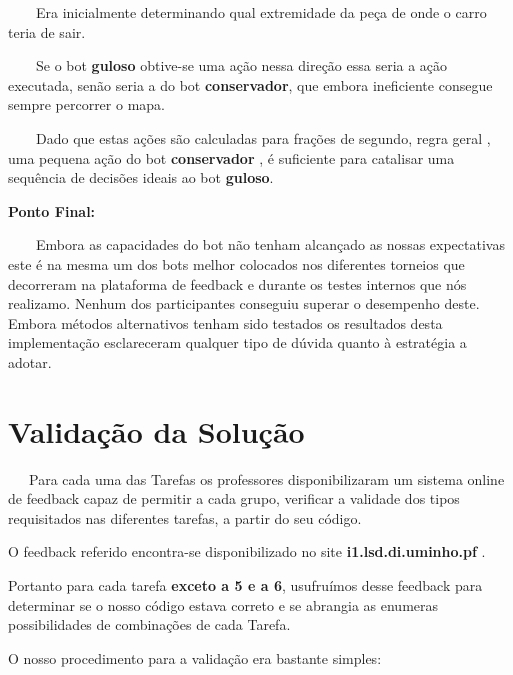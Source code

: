 \documentclass[a4paper]{report} %
\begin{document}
           \par \ \ \ \ Era inicialmente determinando qual extremidade da peça de onde o carro teria de sair.
           \par \ \ \ \ Se o bot \textbf{guloso} obtive-se uma ação nessa direção essa seria a ação executada, senão seria a do bot \textbf{conservador}, que embora ineficiente consegue sempre percorrer o mapa.
           \par \ \ \ \ Dado que estas ações são calculadas para frações de segundo, regra geral , uma pequena ação do bot \textbf{conservador} , é suficiente para catalisar uma sequência de decisões ideais ao bot \textbf{guloso}.
           \vspace{5mm}
           \par \textbf{Ponto Final:}
           \par \ \ \ \ Embora as capacidades do bot não tenham alcançado as nossas expectativas este é na mesma um dos bots melhor colocados nos diferentes torneios que decorreram na plataforma de feedback e durante os testes internos que nós realizamo. Nenhum dos participantes conseguiu superar o desempenho deste. Embora métodos alternativos tenham sido testados os resultados desta implementação esclareceram qualquer tipo de dúvida quanto à estratégia a adotar.
           
          
           
         
   
\chapter{Validação da Solução}
    \par \large{ \ \ \ Para cada uma das Tarefas os professores disponibilizaram um sistema online de feedback capaz de permitir a cada grupo, verificar a validade dos tipos requisitados nas diferentes tarefas, a partir do seu código. 
    \par O feedback referido encontra-se disponibilizado no site \small{ \textbf{i1.lsd.di.uminho.pf} }. \par \large{Portanto para cada tarefa \textbf{exceto a 5 e a 6}, usufruímos desse feedback para determinar se o nosso código estava correto e se abrangia as enumeras possibilidades de combinações de cada Tarefa.}
    \vspace{1.8mm}
    \par O nosso procedimento para a validação era bastante simples:}
   
\end{document}
